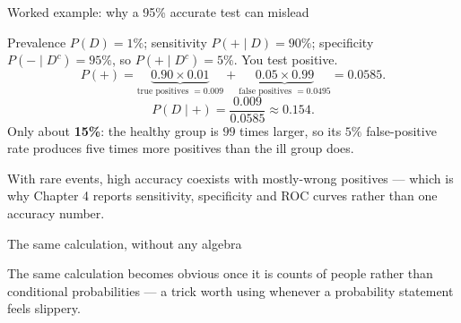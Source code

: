 \documentclass[aspectratio=169,11pt]{beamer}
\begin{document}
\begin{frame}{Worked example: why a 95\% accurate test can mislead}
  \footnotesize
  \begin{numexample}
    Prevalence $P(D) = 1\%$; sensitivity $P(+ \mid D) = 90\%$; specificity
    $P(- \mid D^c) = 95\%$, so $P(+ \mid D^c) = 5\%$. You test positive.
    \[
      P(+) = \underbrace{0.90 \times 0.01}_{\text{true positives } = 0.009}
           + \underbrace{0.05 \times 0.99}_{\text{false positives } = 0.0495}
           = 0.0585 .
    \]
    \[
      P(D \mid +) = \frac{0.009}{0.0585} \approx 0.154 .
    \]
    Only about \textbf{15\%}: the healthy group is $99$ times larger, so its
    $5\%$ false-positive rate produces five times more positives than the ill
    group does.
  \end{numexample}
  \begin{takeaway}
    With rare events, high accuracy coexists with mostly-wrong positives ---
    which is why Chapter 4 reports sensitivity, specificity and ROC curves
    rather than one accuracy number.
  \end{takeaway}
\end{frame}

\begin{frame}{The same calculation, without any algebra}
  \vspace{-3pt}
  \begin{center}
  \end{center}
  \begin{takeaway}
    The same calculation becomes obvious once it is counts of people rather
    than conditional probabilities --- a trick worth using whenever a
    probability statement feels slippery.
  \end{takeaway}
\end{frame}
\end{document}
